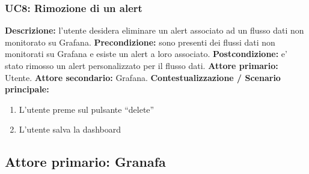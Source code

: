                 \subsubsection{UC8: Rimozione di un alert}
                    \textbf{Descrizione:}  l’utente desidera eliminare un alert associato ad un flusso dati non monitorato su Grafana.
                    \newline
                    \textbf{Precondizione:} sono presenti dei flussi dati non monitorati su Grafana e esiste un alert a loro associato.
                    \newline
                    \textbf{Postcondizione:} e’ stato rimosso un alert personalizzato per il flusso dati.
                    \newline
                    \textbf{Attore primario:} Utente.
                    \newline
                    \textbf{Attore secondario:} Grafana.
                    \newline
                    \textbf{Contestualizzazione / Scenario principale:} \begin{enumerate}
                            \item L’utente preme sul pulsante “delete”
                            \item L’utente salva la dashboard
                        \end{enumerate}
				
		\subsection{Attore primario: Granafa}	
		
